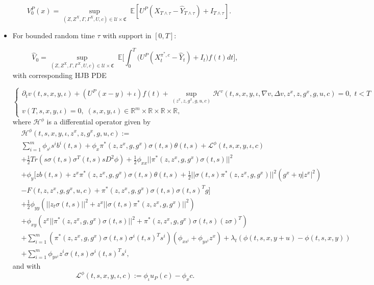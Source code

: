 \documentclass[11pt,a4paper]{article}
\theoremstyle{thmstyleone}%
\theoremstyle{thmstyletwo}%
\theoremstyle{thmstylethree}%
\newcommand{\E}{\mathbb{E}}
\begin{document}
\[
     V_0^P(x)=\sup_{(Z, Z^X, \Gamma, \Gamma^X, U,c)\in \mathcal U\times \mathfrak C}\;\mathbb E[U^P(X_{T\wedge \tau}-\hat Y_{T\wedge \tau})+I_{T\wedge \tau}].\]

     
\begin{itemize}
\item For bounded random time $\tau$ with support in $[0,T]$:

\begin{equation*}
  \hat V_0= \sup_{(Z, Z^X, \Gamma, \Gamma^X, U,c)\in \mathcal U\times \mathfrak C}\;  \E\bigl[ \int_{0}^T \big(U^P(X_t^{\pi^*,c} - \hat{Y}_t) +I_t\big) f(t)dt \bigl],
\end{equation*}
with corresponding HJB PDE

\begin{equation}\label{pde:bounded:consumption}
\begin{cases}
  \partial_t v(t,s,x,y,\iota) + (U^P(x - y)+\iota)f(t) + \sup_{(z^x, z, g^x, g, u,c)}  \mathcal H^v(t,s, x, y,\iota, \nabla v, \Delta v, z^x, z, g^x, g, u,c)=0,\; t<T\\
v(T,s,x,y,\iota)=0,\; (s,x,y,\iota)\in\mathbb R^m\times \mathbb R\times \mathbb R\times\mathbb R,
\end{cases}
\end{equation} where $\mathcal H^\phi$ is a differential operator given by
\begin{align*}
&\mathcal H^\phi(t,s,x,y,\iota,z^x,z,g^x,g,u,c):=\\
&\sum_{i=1}^m\phi_{s^i} s^ib^i(t,s)  + \phi_x \pi^*(z,z^x,g,g^x) \sigma(t,s) \theta(t,s)+ \mathcal L^\phi(t,s,x,y,\iota,c) \\
&+ \frac12 Tr(s \sigma(t, s) \sigma^T(t,s) s D^2\phi)+ \frac{1}{2}\phi_{xx}||\pi^*(z,z^x,g,g^x)  \sigma(t,s)||^2\\
& + \phi_y \Big[z b(t,s) + z^x \pi^*(z,z^x,g,g^x) \sigma(t,s) \theta(t,s)
+ \frac{1}{2}||\sigma(t,s) \pi^*(z,z^x,g,g^x)||^2(g^x + \eta |z^x|^2) \\
&-  F(t, z, z^x, g, g^x,u,c) + \pi^*(z,z^x,g,g^x) \sigma(t,s) \sigma(t,s)^T g\Big]
   \\
&+ \frac{1}{2}\phi_{yy} (||z_t \sigma(t,s)||^2 + z^x||\sigma(t,s) \pi^*(z,z^x,g,g^x)||^2) \\
&+ \phi_{xy} (z^x ||\pi^*(z,z^x,g,g^x) \sigma(t,s)||^2  + \pi^*(z,z^x,g,g^x) \sigma(t,s) (z \sigma)^T)\\
&+ \sum_{i=1}^m (\pi^*(z,z^x,g,g^x)  \sigma(t,s) \sigma^i(t,s)^T s^i)(\phi_{xs^i} + \phi_{ys^i}z^x) + \lambda_t(\phi(t, s,x, y+u) - \phi(t,s, x, y))\\
&+\sum_{i=1}^m \phi_{ys^i} z^i \sigma(t,s) \sigma^i(t,s)^T s^i,
\end{align*}
and with 
\[\mathcal L^\phi(t,s,x,y,\iota,c):=\phi_\iota u_P(c)-\phi_x c.\]


\end{itemize}
\end{document}
